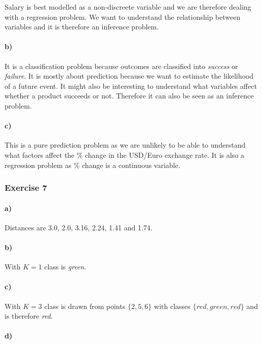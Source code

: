 \documentclass[10pt,a4paper]{article}
\begin{document}
Salary is best modelled as a non-discreete variable and we are
therefore dealing with a regression problem. We want to understand the
relationship between variables and it is therefore an inference
problem.

\paragraph{b)}

It is a classification problem because outcomes are classified into
\textit{success} or \textit{failure}. It is mostly about prediction
because we want to estimate the likelihood of a future event. It might
also be interesting to understand what variables affect whether a
product succeeds or not. Therefore it can also be seen as an inference
problem.

\paragraph{c)}

This is a pure prediction problem as we are unlikely to be able to
understand what factors affect the \% change in the USD/Euro exchange
rate. It is also a regression problem as \% change is a continuous
variable.

\subsubsection{Exercise 7}

\paragraph{a)}

Distances are 3.0, 2.0, 3.16, 2.24, 1.41 and 1.74.

\paragraph{b)}

With $K = 1$ class is \textit{green}.

\paragraph{c)}

With $K = 3$ class is drawn from points $\{2, 5, 6\}$ with classes
$\{red, green, red\}$ and is therefore \textit{red}.

\paragraph{d)}
\end{document}
